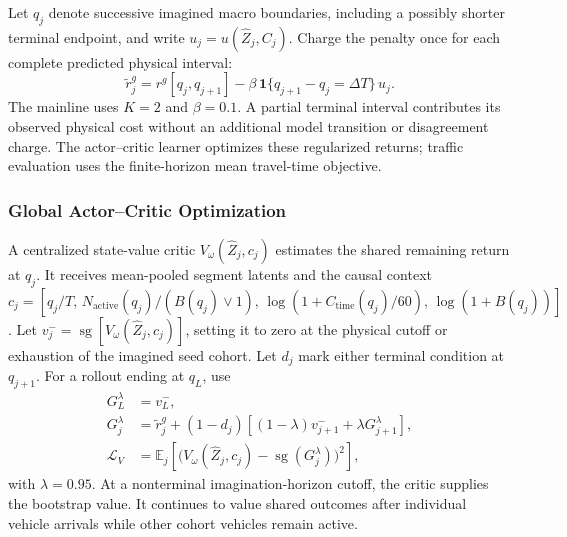 Let $q_j$ denote successive imagined macro boundaries, including a
possibly shorter terminal endpoint, and write
$u_j=u(\widehat Z_j,C_j)$. Charge the penalty once for each complete
predicted physical interval:
\begin{equation}
 \widetilde r_j^g
   =r^g[q_j,q_{j+1}]
     -\beta\,\mathbf1\{q_{j+1}-q_j=\Delta T\}\,u_j.
 \label{eq:regularized-event-reward}
\end{equation}
The mainline uses $K=2$ and $\beta=0.1$. A partial terminal interval
contributes its observed physical cost without an additional model
transition or disagreement charge. The actor--critic learner optimizes
these regularized returns; traffic evaluation uses the finite-horizon
mean travel-time objective.

\subsubsection{Global Actor--Critic Optimization}

A centralized state-value critic $V_\omega(\widehat Z_j,c_j)$ estimates
the shared remaining return at $q_j$. It receives mean-pooled segment
latents and the causal context
$c_j=[q_j/T,\,N_{\mathrm{active}}(q_j)/(B(q_j)\vee1),\,
\log(1+C_{\mathrm{time}}(q_j)/60),\,\log(1+B(q_j))]$.
Let $v_j^-=\operatorname{sg}[V_\omega(\widehat Z_j,c_j)]$,
setting it to zero at the physical cutoff or exhaustion of the imagined
seed cohort. Let $d_j$ mark either terminal condition at $q_{j+1}$.
For a rollout ending at $q_L$, use
\begin{equation}
 \begin{aligned}
 G_L^\lambda&=v_L^-,\\
 G_j^\lambda&=\widetilde r_j^g+
       (1-d_j)[(1-\lambda)v_{j+1}^-+\lambda G_{j+1}^\lambda],\\
 \mathcal L_V&=\mathbb E_j\!\left[
       \bigl(V_\omega(\widehat Z_j,c_j)
                -\operatorname{sg}(G_j^\lambda)\bigr)^2\right],
 \end{aligned}
 \label{eq:global-lambda-return}
\end{equation}
with $\lambda=0.95$. At a nonterminal imagination-horizon cutoff, the
critic supplies the bootstrap value. It continues to value shared
outcomes after individual vehicle arrivals while other cohort vehicles
remain active.

